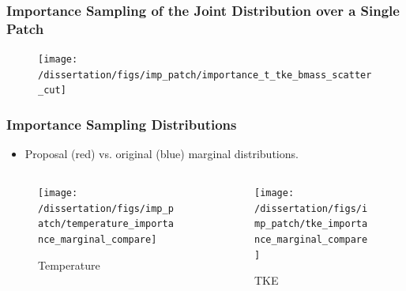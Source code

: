 \documentclass[t, pdftex]{beamer}
\begin{document}
\begin{frame}
\frametitle{\small Importance Sampling of the Joint Distribution over a Single Patch}
\vspace{-19pt}
\begin{figure}[!htbp]
    \centering
    \texttt{[image: /dissertation/figs/imp\_patch/importance\_t\_tke\_bmass\_scatter\_cut]}
    \label{model_overview}
\end{figure}
\end{frame}

\begin{frame}
\frametitle{Importance Sampling Distributions}

\begin{itemize}
    \item {\color{utred} Proposal (red)} vs. {\color{utblue} original (blue)} marginal distributions.
\end{itemize}
\vspace{-18pt}
\begin{columns}
    \begin{column}{0.5\textwidth}
\begin{figure}[]
\centering
\texttt{[image: /dissertation/figs/imp\_patch/temperature\_importance\_marginal\_compare]}
\caption{\centering Temperature}
\label{model_overview}
\end{figure}
\end{column}
\begin{column}{0.5\textwidth}
\begin{figure}[]
\centering
\texttt{[image: /dissertation/figs/imp\_patch/tke\_importance\_marginal\_compare]}\\
\caption{\centering TKE}
\label{model_overview}
\end{figure}
\end{column}
\end{columns}
\end{frame}
\end{document}
